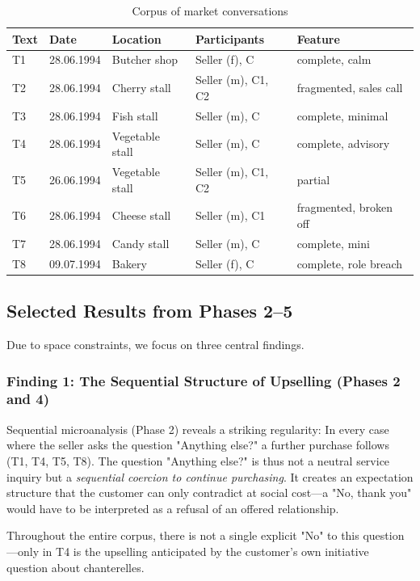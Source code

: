 \documentclass[12pt,a4paper]{article}
\begin{document}
\begin{table}[H]
\centering
\caption{Corpus of market conversations}
\begin{tabular}{@{}lllll@{}}
\toprule
Text & Date & Location & Participants & Feature \\
\midrule
T1 & 28.06.1994 & Butcher shop & Seller (f), C & complete, calm \\
T2 & 28.06.1994 & Cherry stall & Seller (m), C1, C2 & fragmented, sales call \\
T3 & 28.06.1994 & Fish stall & Seller (m), C & complete, minimal \\
T4 & 28.06.1994 & Vegetable stall & Seller (m), C & complete, advisory \\
T5 & 26.06.1994 & Vegetable stall & Seller (m), C1, C2 & partial \\
T6 & 28.06.1994 & Cheese stall & Seller (m), C1 & fragmented, broken off \\
T7 & 28.06.1994 & Candy stall & Seller (m), C & complete, mini \\
T8 & 09.07.1994 & Bakery & Seller (f), C & complete, role breach \\
\bottomrule
\end{tabular}
\end{table}

\subsection{Selected Results from Phases 2–5}

Due to space constraints, we focus on three central findings.

\subsubsection{Finding 1: The Sequential Structure of Upselling (Phases 2 and 4)}

Sequential microanalysis (Phase 2) reveals a striking regularity: In every case where the seller asks the question "Anything else?" a further purchase follows (T1, T4, T5, T8). The question "Anything else?" is thus not a neutral service inquiry but a \textit{sequential coercion to continue purchasing}. It creates an expectation structure that the customer can only contradict at social cost—a "No, thank you" would have to be interpreted as a refusal of an offered relationship.

Throughout the entire corpus, there is not a single explicit "No" to this question—only in T4 is the upselling anticipated by the customer's own initiative question about chanterelles.
\end{document}
